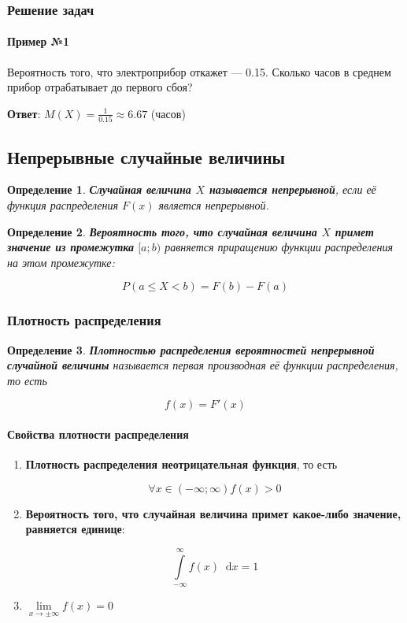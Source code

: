 \documentclass{article}
\newcommand*\diff{\mathop{}\!\mathrm{d}}
\newtheorem{definition}{Определение}
\begin{document}
\subsubsection{Решение задач}

\paragraph{Пример №1}

Вероятность того, что электроприбор откажет — 0.15. Сколько часов в среднем прибор отрабатывает до первого сбоя?

\textbf{Ответ}: $M(X) = \frac{1}{0.15} \approx 6.67$ (часов)

\subsection{Непрерывные случайные величины}

\begin{definition}
    \textbf{Случайная величина $X$ называется непрерывной}, если её функция распределения $F(x)$ является непрерывной.
\end{definition}

\begin{definition}
    \textbf{Вероятность того, что случайная величина $X$ примет значение из промежутка} $[a; b)$ равняется приращению функции распределения на этом промежутке:

    $$
        P(a \le X < b) = F(b) - F(a)
    $$
\end{definition}

\subsubsection{Плотность распределения}

\begin{definition}
    \textbf{Плотностью распределения вероятностей непрерывной случайной величины} называется первая производная её функции распределения, то есть

    $$f(x) = F'(x)$$
\end{definition}

\paragraph{Свойства плотности распределения}

\begin{enumerate}
    \item \textbf{Плотность распределения неотрицательная функция}, то есть
    
    $$\forall x \in (-\infty; \infty) f(x) > 0$$
    \item \textbf{Вероятность того, что случайная величина примет какое-либо значение, равняется единице}: 
    
    $$\int\limits_{-\infty}^{\infty} f(x) \diff x = 1$$
    \item $\lim\limits_{x \to \pm \infty} f(x) = 0$
\end{enumerate}
\end{document}
